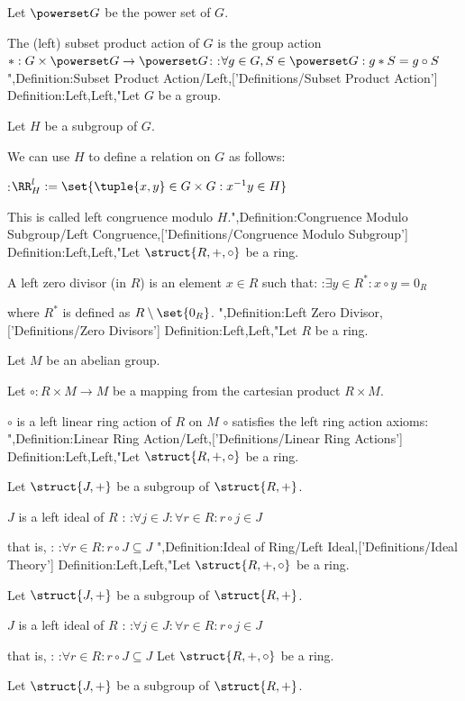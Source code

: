 Let $\powerset G$ be the power set of $G$.


The (left) subset product action of $G$ is the group action $*: G \times \powerset G \to \powerset G$:
:$\forall g \in G, S \in \powerset G: g * S = g \circ S$",Definition:Subset Product Action/Left,['Definitions/Subset Product Action']
Definition:Left,Left,"Let $G$ be a group.

Let $H$ be a subgroup of $G$.


We can use $H$ to define a relation on $G$ as follows:

:$\RR^l_H := \set {\tuple {x, y} \in G \times G: x^{-1} y \in H}$

This is called left congruence modulo $H$.",Definition:Congruence Modulo Subgroup/Left Congruence,['Definitions/Congruence Modulo Subgroup']
Definition:Left,Left,"Let $\struct {R, +, \circ}$ be a ring.


A left zero divisor (in $R$) is an element $x \in R$ such that:
:$\exists y \in R^*: x \circ y = 0_R$

where $R^*$ is defined as $R \setminus \set {0_R}$.
",Definition:Left Zero Divisor,['Definitions/Zero Divisors']
Definition:Left,Left,"Let $R$ be a ring.

Let $M$ be an abelian group.

Let $\circ : R \times M \to M$ be a mapping from the cartesian product $R \times M$.


$\circ$ is a left linear ring action of $R$ on $M$  $\circ$ satisfies the left ring action axioms:
",Definition:Linear Ring Action/Left,['Definitions/Linear Ring Actions']
Definition:Left,Left,"Let $\struct {R, +, \circ}$ be a ring.

Let $\struct {J, +}$ be a subgroup of $\struct {R, +}$.


$J$ is a left ideal of $R$ :
:$\forall j \in J: \forall r \in R: r \circ j \in J$

that is, :
:$\forall r \in R: r \circ J \subseteq J$
",Definition:Ideal of Ring/Left Ideal,['Definitions/Ideal Theory']
Definition:Left,Left,"Let $\struct {R, +, \circ}$ be a ring.

Let $\struct {J, +}$ be a subgroup of $\struct {R, +}$.


$J$ is a left ideal of $R$ :
:$\forall j \in J: \forall r \in R: r \circ j \in J$

that is, :
:$\forall r \in R: r \circ J \subseteq J$
Let $\struct {R, +, \circ}$ be a ring.

Let $\struct {J, +}$ be a subgroup of $\struct {R, +}$.



